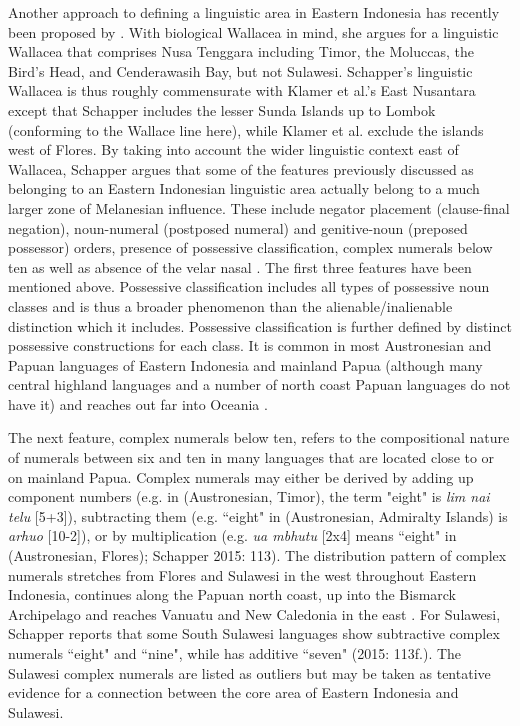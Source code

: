Another approach to defining a linguistic area in Eastern Indonesia has recently been proposed by \citet{schapper2015wallacea}. With biological Wallacea in mind, she argues for a linguistic Wallacea that comprises Nusa Tenggara including Timor, the Moluccas, the
Bird’s Head, and Cenderawasih Bay, but not Sulawesi. Schapper's linguistic Wallacea is thus roughly commensurate with Klamer et al.'s East Nusantara except that Schapper includes the lesser Sunda Islands up to Lombok (conforming to the Wallace line here), while Klamer et al. exclude the islands west of Flores. By taking into account the wider linguistic context east of Wallacea, Schapper argues that some of the features previously discussed as belonging to an Eastern Indonesian linguistic area actually belong to a much larger zone of Melanesian influence. These include negator placement (clause-final negation), noun-numeral (postposed numeral) and genitive-noun (preposed possessor) orders, presence of possessive classification, complex numerals below ten as well as absence of the velar nasal . The first three features have been mentioned above. Possessive classification includes all types of possessive noun classes and is thus a broader phenomenon than the alienable/inalienable distinction which it includes. Possessive classification is further defined by distinct possessive constructions for each class. It is common in most Austronesian and Papuan languages of Eastern Indonesia and mainland Papua (although many central highland languages and a number of north coast Papuan languages do not have it) and reaches out far into Oceania \citep[109]{schapper2015wallacea}.

The next feature, complex numerals below ten, refers to the compositional nature of numerals between six and ten in many languages that are located close to or on mainland Papua. Complex numerals may either be derived by adding up component numbers (e.g. in  (Austronesian, Timor), the term "eight" is \textit{lim nai telu}
[5+3]), subtracting them (e.g. ``eight" in  (Austronesian, Admiralty Islands) is \textit{arhuo} [10-2]), or by multiplication (e.g. \textit{ua mbhutu} [2x4] means ``eight" in  (Austronesian, Flores); Schapper 2015: 113). The distribution pattern of complex numerals stretches from Flores and Sulawesi in the west throughout Eastern Indonesia, continues along the Papuan north coast, up into the Bismarck Archipelago and reaches Vanuatu and New Caledonia in the east \citep[112--4]{schapper2015wallacea}. For Sulawesi, Schapper reports that some South Sulawesi languages show subtractive complex numerals ``eight" and ``nine", while  has additive ``seven" (2015: 113f.). The Sulawesi complex numerals are listed as outliers but may be taken as tentative evidence for a connection between the core area of Eastern Indonesia and Sulawesi.

